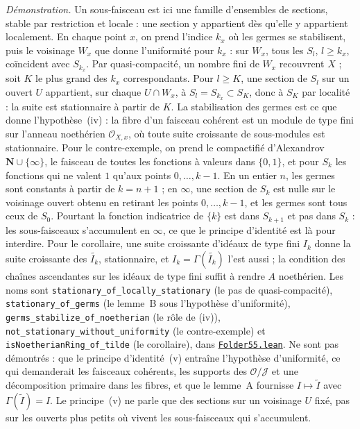 {\small \emph{Démonstration.} Un sous-faisceau est ici une famille d'ensembles de sections, stable par restriction et locale : une section y appartient dès qu'elle y appartient localement. En chaque point $x$, on prend l'indice $k_x$ où les germes se stabilisent, puis le voisinage $W_x$ que donne l'uniformité pour $k_x$ : sur $W_x$, tous les $S_l$, $l \geq k_x$, coïncident avec $S_{k_x}$. Par quasi-compacité, un nombre fini de $W_x$ recouvrent $X$ ; soit $K$ le plus grand des $k_x$ correspondants. Pour $l \geq K$, une section de $S_l$ sur un ouvert $U$ appartient, sur chaque $U \cap W_x$, à $S_l = S_{k_x} \subset S_K$, donc à $S_K$ par localité : la suite est stationnaire à partir de $K$. La stabilisation des germes est ce que donne l'hypothèse~(iv) : la fibre d'un faisceau cohérent est un module de type fini sur l'anneau noethérien $\mathcal O_{X,x}$, où toute suite croissante de sous-modules est stationnaire. Pour le contre-exemple, on prend le compactifié d'Alexandrov $\mathbf N \cup \{\infty\}$, le faisceau de toutes les fonctions à valeurs dans $\{0, 1\}$, et pour $S_k$ les fonctions qui ne valent $1$ qu'aux points $0, \ldots, k-1$. En un entier $n$, les germes sont constants à partir de $k = n + 1$ ; en $\infty$, une section de $S_k$ est nulle sur le voisinage ouvert obtenu en retirant les points $0, \ldots, k-1$, et les germes sont tous ceux de $S_0$. Pourtant la fonction indicatrice de $\{k\}$ est dans $S_{k+1}$ et pas dans $S_k$ : les sous-faisceaux s'accumulent en $\infty$, ce que le principe d'identité est là pour interdire. Pour le corollaire, une suite croissante d'idéaux de type fini $I_k$ donne la suite croissante des $\widetilde{I_k}$, stationnaire, et $I_k = \Gamma(\widetilde{I_k})$ l'est aussi ; la condition des chaînes ascendantes sur les idéaux de type fini suffit à rendre $A$ noethérien. Les noms sont \texttt{stationary\_of\_locally\_stationary} (le pas de quasi-compacité), \texttt{stationary\_of\_germs} (le lemme~B sous l'hypothèse d'uniformité), \texttt{germs\_stabilize\_of\_noetherian} (le rôle de (iv)), \texttt{not\_stationary\_without\_uniformity} (le contre-exemple) et \texttt{isNoetherianRing\_of\_tilde} (le corollaire), dans \href{\leanblob/AlgebraicGeometry/Folder55.lean}{\texttt{Folder55.\allowbreak{}lean}}. Ne sont pas démontrés : que le principe d'identité~(v) entraîne l'hypothèse d'uniformité, ce qui demanderait les faisceaux cohérents, les supports des $\mathcal O/\mathcal J$ et une décomposition primaire dans les fibres, et que le lemme~A fournisse $I \mapsto \widetilde I$ avec $\Gamma(\widetilde I) = I$. Le principe~(v) ne parle que des sections sur un voisinage $U$ fixé, pas sur les ouverts plus petits où vivent les sous-faisceaux qui s'accumulent.\par}
